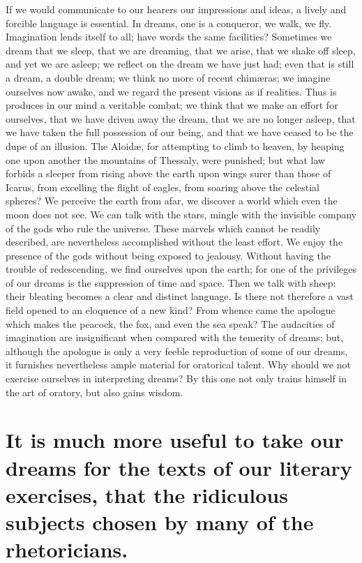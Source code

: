 \documentclass[12pt]{article}
\begin{document}
If we would communicate to our hearers our impressions and ideas, a lively and
forcible language is essential. In dreams, one is a conqueror, we walk, we fly.
Imagination lends itself to all; have words the same facilities? Sometimes we
dream that we sleep, that we are dreaming, that we arise, that we shake off
sleep, and yet we are asleep; we reflect on the dream we have just had; even
that is still a dream, a double dream; we think no more of recent chim{\ae}ras;
we imagine ourselves now awake, and we regard the present visions as if
realities. Thus is produces in our mind a veritable combat; we think that we
make an effort for ourselves, that we have driven away the dream, that we are
no longer asleep, that we have taken the full possession of our being, and that
we have ceased to be the dupe of an illusion. The Aloid{\ae}, for attempting to
climb to heaven, by heaping one upon another the mountains of Thessaly, were
punished; but what law forbids a sleeper from rising above the earth upon wings
surer than those of Icarus, from excelling the flight of eagles, from soaring
above the celestial spheres? We perceive the earth from afar, we discover a
world which even the moon does not see. We can talk with the stars, mingle with
the invisible company of the gods who rule the universe. These marvels which
cannot be readily described, are nevertheless accomplished without the least
effort. We enjoy the presence of the gods without being exposed to jealousy.
Without having the trouble of redescending, we find ourselves upon the earth;
for one of the privileges of our dreams is the suppression of time and space.
Then we talk with sheep: their bleating becomes a clear and distinct language.
Is there not therefore a vast field opened to an eloquence of a new kind? From
whence came the apologue which makes the peacock, the fox, and even the sea
speak? The audacities of imagination are insignificant when compared with the
temerity of dreams; but, although the apologue is only a very feeble
reproduction of some of our dreams, it furnishes nevertheless ample material
for oratorical talent. Why should we not exercise ourselves in interpreting
dreams? By this one not only trains himself in the art of oratory, but also
gains wisdom.


\section{It is much more useful to take our dreams for the texts of our
literary exercises, that the ridiculous subjects chosen by many of the
rhetoricians.}
\end{document}
